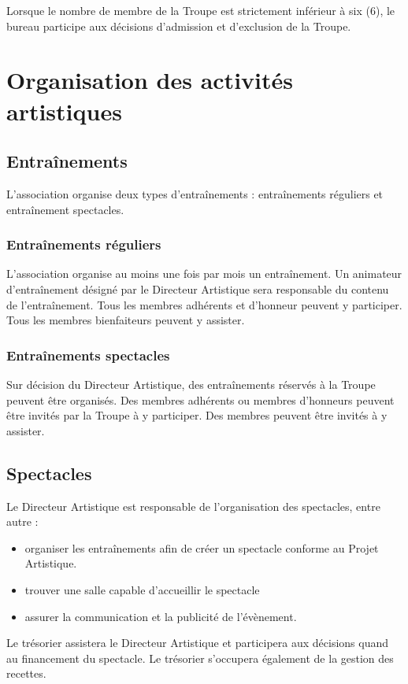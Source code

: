 \documentclass[a4paper,french,10pt]{article}
\begin{document}
Lorsque le nombre de membre de la Troupe est strictement inférieur à six (6), le bureau participe aux décisions d'admission et d'exclusion de la Troupe.

\section{Organisation des activités artistiques}
\subsection{Entraînements}
L'association organise deux types d'entraînements : entraînements réguliers et entraînement spectacles.

\subsubsection{Entraînements réguliers}
L'association organise au moins une fois par mois un entraînement. Un animateur d'entraînement désigné par le Directeur Artistique sera responsable du contenu de l'entraînement. Tous les membres adhérents et d'honneur peuvent y participer. Tous les membres bienfaiteurs peuvent y assister.

\subsubsection{Entraînements spectacles}
Sur décision du Directeur Artistique, des entraînements réservés à la Troupe peuvent être organisés. Des membres adhérents ou membres d'honneurs peuvent être invités par la Troupe à y participer. Des membres peuvent être invités à y assister.

\subsection{Spectacles}
\label{sec:spectacles}
Le Directeur Artistique est responsable de l'organisation des spectacles, entre autre :
\begin{itemize}
\item organiser les entraînements afin de créer un spectacle conforme au Projet Artistique.
\item trouver une salle capable d'accueillir le spectacle
\item assurer la communication et la publicité de l'évènement.
\end{itemize}

Le trésorier assistera le Directeur Artistique et participera aux décisions quand au financement du spectacle. Le trésorier s'occupera également de la gestion des recettes.
\end{document}
